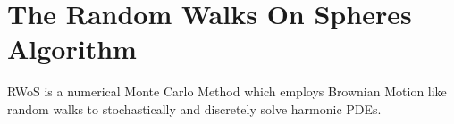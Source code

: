 %
%

\section{The Random Walks On Spheres Algorithm}
\Gls{RWoS} is a numerical Monte Carlo Method which employs Brownian Motion
like random walks to stochastically and discretely solve
harmonic \glspl{PDE}.
\par

